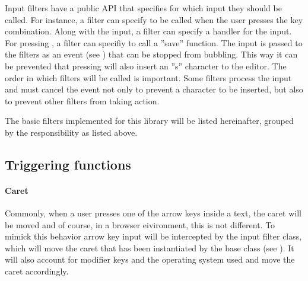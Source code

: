 Input filters have a public API that specifies for which input they should be called. For instance, a filter can specify to be called when the user presses the  key combination. Along with the input, a filter can specify a handler for the input. For pressing , a filter can specifiy to call a ''save'' function. The input is passed to the filters as an event (see ) that can be stopped from bubbling. This way it can be prevented that pressing  will also insert an ''s'' character to the editor. The order in which filters will be called is important. Some filters process the input and must cancel the event not only to prevent a character to be inserted, but also to prevent other filters from taking action.



The basic filters implemented for this library will be listed hereinafter, grouped by the responsibility as listed above.





\subsection{Triggering functions}

\paragraph{Caret} Commonly, when a user presses one of the arrow keys inside a text, the caret will be moved and of course, in a browser eivironment, this is not different. To mimick this behavior arrow key input will be intercepted by the  input filter class, which will move the caret that has been instantiated by the  base class (see ). It will also account for modifier keys and the operating system used and move the caret accordingly.


